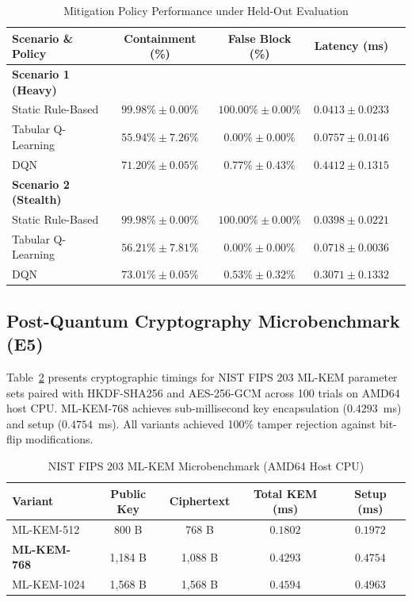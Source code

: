 \documentclass[journal]{IEEEtran}
\begin{document}
\begin{table}[h]
\centering
\caption{Mitigation Policy Performance under Held-Out Evaluation}
\label{tab:e4_policy}
\begin{tabular}{lcccc}
\toprule
Scenario \& Policy & Containment (\%) & False Block (\%) & Latency (ms) \\
\midrule
\textbf{Scenario 1 (Heavy)} & & & \\
Static Rule-Based & $99.98\% \pm 0.00\%$ & $100.00\% \pm 0.00\%$ & $0.0413 \pm 0.0233$ \\
Tabular Q-Learning & $55.94\% \pm 7.26\%$ & $\mathbf{0.00\% \pm 0.00\%}$ & $\mathbf{0.0757 \pm 0.0146}$ \\
DQN & $\mathbf{71.20\% \pm 0.05\%}$ & $0.77\% \pm 0.43\%$ & $0.4412 \pm 0.1315$ \\
\midrule
\textbf{Scenario 2 (Stealth)} & & & \\
Static Rule-Based & $99.98\% \pm 0.00\%$ & $100.00\% \pm 0.00\%$ & $0.0398 \pm 0.0221$ \\
Tabular Q-Learning & $56.21\% \pm 7.81\%$ & $\mathbf{0.00\% \pm 0.00\%}$ & $\mathbf{0.0718 \pm 0.0036}$ \\
DQN & $\mathbf{73.01\% \pm 0.05\%}$ & $0.53\% \pm 0.32\%$ & $0.3071 \pm 0.1332$ \\
\bottomrule
\end{tabular}
\end{table}

\subsection{Post-Quantum Cryptography Microbenchmark (E5)}
Table~\ref{tab:e5_crypto} presents cryptographic timings for NIST FIPS 203 ML-KEM parameter sets paired with HKDF-SHA256 and AES-256-GCM across 100 trials on AMD64 host CPU. ML-KEM-768 achieves sub-millisecond key encapsulation ($0.4293$~ms) and setup ($0.4754$~ms). All variants achieved 100\% tamper rejection against bit-flip modifications.

\begin{table}[h]
\centering
\caption{NIST FIPS 203 ML-KEM Microbenchmark (AMD64 Host CPU)}
\label{tab:e5_crypto}
\begin{tabular}{lcccc}
\toprule
Variant & Public Key & Ciphertext & Total KEM (ms) & Setup (ms) \\
\midrule
ML-KEM-512 & 800 B & 768 B & $0.1802$ & $0.1972$ \\
\textbf{ML-KEM-768} & 1,184 B & 1,088 B & $\mathbf{0.4293}$ & $\mathbf{0.4754}$ \\
ML-KEM-1024 & 1,568 B & 1,568 B & $0.4594$ & $0.4963$ \\
\bottomrule
\end{tabular}
\end{table}
\end{document}
